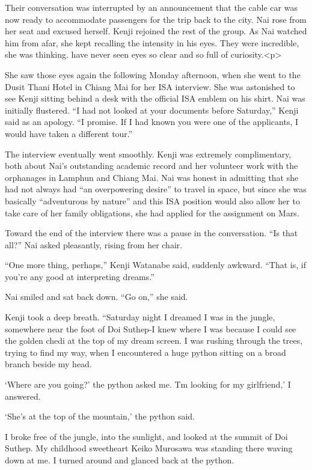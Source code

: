 \documentclass[]{article}
\begin{document}
{Their conversation was interrupted by an announcement that the cable car was now ready to accommodate passengers for the trip back to the city. Nai rose from her seat and excused herself. Kenji rejoined the rest of the group. As Nai watched him from afar, she kept recalling the intensity in his eyes. They were incredible, she was thinking. have never seen eyes so clear and so full of curiosity.<p>

She saw those eyes again the following Monday afternoon, when she went to the Dusit Thani Hotel in Chiang Mai for her ISA interview. She was astonished to see Kenji sitting behind a desk with the official ISA emblem on his shirt. Nai was initially flustered. “I had not looked at your documents before Saturday,” Kenji said as an apology. “I promise. If I had known you were one of the applicants, I would have taken a different tour.”

The interview eventually went smoothly. Kenji was extremely complimentary, both about Nai’s outstanding academic record and her volunteer work with the orphanages in Lamphun and Chiang Mai. Nai was honest in admitting that she had not always had “an overpowering desire” to travel in space, but since she was basically “adventurous by nature” and this ISA position would also allow her to take care of her family obligations, she had applied for the assignment on Mars.

Toward the end of the interview there was a pause in the conversation. “Is that all?” Nai asked pleasantly, rising from her chair.

“One more thing, perhaps,” Kenji Watanabe said, suddenly awkward. “That is, if you’re any good at interpreting dreams.”

Nai smiled and sat back down. “Go on,” she said.

Kenji took a deep breath. “Saturday night I dreamed I was in the jungle, somewhere near the foot of Doi Suthep-I knew where I was because I could see the golden chedi at the top of my dream screen. I was rushing through the trees, trying to find my way, when I encountered a huge python sitting on a broad branch beside my head.

‘Where are you going?’ the python asked me. Tm looking for my girlfriend,’ I answered.

‘She’s at the top of the mountain,’ the python said.

I broke free of the jungle, into the sunlight, and looked at the summit of Doi Suthep. My childhood sweetheart Keiko Murosawa was standing there waving down at me. I turned around and glanced back at the python.

}
\end{document}
